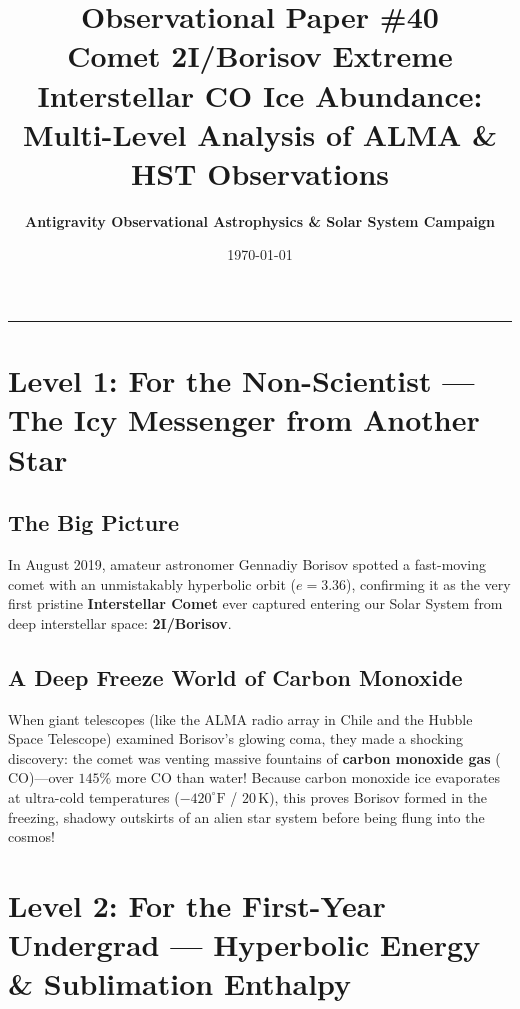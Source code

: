 \documentclass[11pt,a4paper]{article}
\title{\Huge \textbf{Observational Paper \#40}\\ \Large Comet 2I/Borisov Extreme Interstellar CO Ice Abundance: Multi-Level Analysis of ALMA \& HST Observations}
\author{\textbf{Antigravity Observational Astrophysics \& Solar System Campaign}}
\date{\today}
\begin{document}
\maketitle

\vspace{-1em}
\begin{center}
\rule{\textwidth}{1.5pt}
\end{center}

\section*{Level 1: For the Non-Scientist — The Icy Messenger from Another Star}

\subsection*{The Big Picture}
In August 2019, amateur astronomer Gennadiy Borisov spotted a fast-moving comet with an unmistakably hyperbolic orbit ($e = 3.36$), confirming it as the very first pristine \textbf{Interstellar Comet} ever captured entering our Solar System from deep interstellar space: \textbf{2I/Borisov}.

\subsection*{A Deep Freeze World of Carbon Monoxide}
When giant telescopes (like the ALMA radio array in Chile and the Hubble Space Telescope) examined Borisov's glowing coma, they made a shocking discovery: the comet was venting massive fountains of \textbf{carbon monoxide gas} ($\mathrm{CO}$)—over $145\%$ more CO than water! Because carbon monoxide ice evaporates at ultra-cold temperatures ($-420^\circ\text{F}$ / $20\,\text{K}$), this proves Borisov formed in the freezing, shadowy outskirts of an alien star system before being flung into the cosmos!

\newpage

\section*{Level 2: For the First-Year Undergrad — Hyperbolic Energy \& Sublimation Enthalpy}
\end{document}
